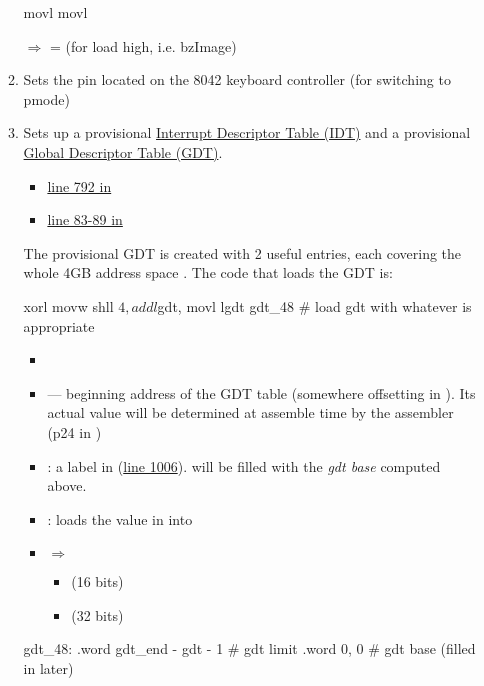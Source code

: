\begin{itemize}
\begin{enumerate}
    \begin{gascode}
      movl %
      movl %
    \end{gascode}
     $\Rightarrow$  =  (for
    load high, i.e. bzImage)
\item Sets the \href{http://en.wikipedia.org/wiki/A20_line}{} pin located on
    the 8042 keyboard controller (for switching to pmode)
  \item Sets up a provisional
    \href{http://en.wikipedia.org/wiki/Interrupt_descriptor_table}{Interrupt Descriptor
      Table (IDT)} and a provisional
    \href{http://en.wikipedia.org/wiki/Global_Descriptor_Table}{Global Descriptor Table
      (GDT)}.
    \begin{itemize}
    \item \href{http://lxr.linux.no/linux+v2.6.11/arch/i386/boot/setup.S#L792}{line 792 in
        }
    \item \href{http://lxr.linux.no/linux+v2.6.11/include/asm-i386/segment.h#L83}{line 83-89 in }
    \end{itemize}
    The provisional GDT is created with 2 useful entries, each covering the whole 4GB
    address space \cite{abhishek2002memory}. The code that loads the GDT is:
    \begin{gascode}
      xorl %
      movw %
      shll $4, %
      addl $gdt, %
      movl %
      lgdt gdt_48     # load gdt with whatever is appropriate
    \end{gascode}
\begin{itemize}
\item {}
\item {} --- beginning address of the GDT table (somewhere offsetting in
  ). Its actual value will be determined at assemble time by the assembler (p24
  in \cite{bartlett2009programming})
\item {}: a label in 
  (\href{http://lxr.linux.no/linux+v2.6.11/arch/i386/boot/setup.S#L1006}{line
    1006}).  will be filled with the \emph{gdt base} computed above.
\item {}: loads the value in  into 
\item {} $\Rightarrow$ 
  \begin{itemize}
  \item {} (16 bits)
  \item {} (32 bits)
  \end{itemize}
\end{itemize}
\begin{gascode}
gdt_48:
     .word      gdt_end - gdt - 1   # gdt limit
     .word      0, 0                # gdt base (filled in later)


\end{gascode}
\end{enumerate}
\end{itemize}
